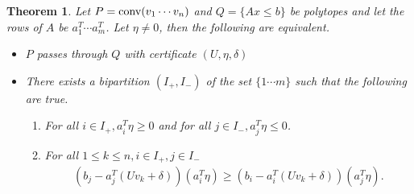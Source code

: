 \documentclass[a4paper]{amsart}
\newtheorem{thm}{Theorem}
\theoremstyle{remark}
\begin{document}
\begin{thm} \label{thm:pass_through_simplified}
	Let $P=\textup{conv}(v_1 \cdots v_n)$ and $Q=\{Ax \leq b\}$ be polytopes and let the rows of $A$ be $a_1^T \cdots a_m^T$. Let $\eta \neq 0$, then the following are equivalent.
	\begin{itemize}
		\item $P$ passes through $Q$ with certificate $(U, \eta, \delta)$
		\item There exists a bipartition $(I_+, I_-)$ of the set $\{1 \cdots m\}$ such that the following are true.
		      \begin{enumerate}
		      	\item For all $i \in I_+, a_i^T \eta \geq 0$ and for all $j \in I_-, a_j^T \eta \leq 0$.
		      	\item For all $1 \leq k \leq n, i \in I_+, j \in I_-$
		      	      \begin{gather*}
		      	      	(b_j-a_j^T(Uv_k+\delta))(a_i^T\eta) \geq (b_i-a_i^T(Uv_k+\delta))(a_j^T\eta).
		      	      \end{gather*}
		      \end{enumerate}
	\end{itemize}
\end{thm}
\end{document}
